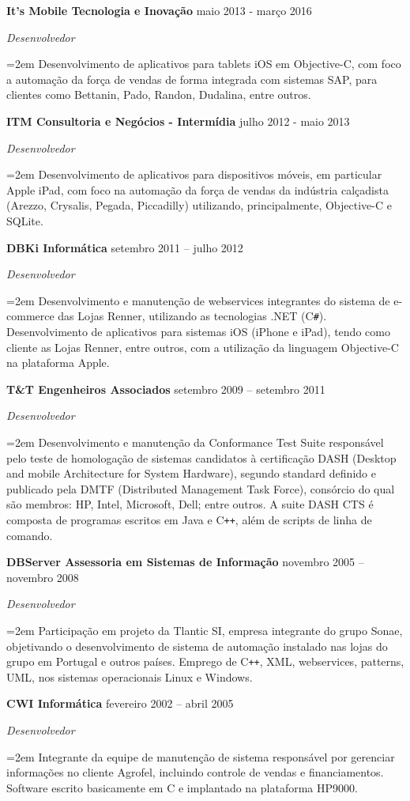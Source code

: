 \documentclass[paper=a4,fontsize=11pt]{scrartcl} %
\newcommand{\sepspace}{\vspace*{1em}}		%
\newcommand{\EducationEntry}[4]{
		\noindent \textbf{#1} \hfill      %
        #2 \par
		\noindent \textit{#3} \par        %
		\noindent\hangindent=2em\hangafter=0 \small #4 %
		\normalsize \par}
\newcommand{\WorkEntry}[4]{				  %
		\noindent \textbf{#1} \hfill      %
        #2 \par
		\noindent \textit{#3} \par        %
		\noindent\hangindent=2em\hangafter=0 \small #4 %
		\normalsize \par}
\begin{document}
\WorkEntry{It’s Mobile Tecnologia e Inovação}{maio 2013 - março 2016}{Desenvolvedor}{Desenvolvimento de aplicativos para tablets iOS em Objective-C, com foco a automação da força de vendas de forma integrada com sistemas SAP, para clientes como Bettanin, Pado, Randon, Dudalina, entre outros.}

\newpage

\WorkEntry{ITM Consultoria e Negócios - Intermídia}{julho 2012 - maio 2013}{Desenvolvedor}{Desenvolvimento de aplicativos para dispositivos móveis, em particular Apple iPad, com foco na automação da força de vendas da indústria calçadista (Arezzo, Crysalis, Pegada, Piccadilly) utilizando, principalmente, Objective-C e SQLite.}
\sepspace
\sepspace

\WorkEntry{DBKi Informática}{setembro 2011 – julho 2012}{Desenvolvedor}{Desenvolvimento e manutenção de webservices integrantes do sistema de e-commerce das Lojas Renner, utilizando as tecnologias .NET (C\texttt{\#}). Desenvolvimento de aplicativos para sistemas iOS (iPhone e iPad), tendo como cliente as Lojas Renner, entre outros, com a utilização da linguagem Objective-C na plataforma Apple.}
\sepspace
\sepspace

\WorkEntry{T\&T Engenheiros Associados}{setembro 2009 – setembro 2011}{Desenvolvedor}{Desenvolvimento e manutenção da Conformance Test Suite responsável pelo teste de homologação de sistemas candidatos à certificação DASH (Desktop and mobile Architecture for System Hardware), segundo standard definido e publicado pela DMTF (Distributed Management Task Force), consórcio do qual são membros: HP, Intel, Microsoft, Dell; entre outros. A suite DASH CTS é composta de programas escritos em Java e C\texttt{++}, além de scripts de linha de comando.}
\sepspace
\sepspace

\WorkEntry{DBServer Assessoria em Sistemas de Informação}{novembro 2005 – novembro 2008}{Desenvolvedor}{Participação em projeto da Tlantic SI, empresa integrante do grupo Sonae, objetivando o desenvolvimento de sistema de automação instalado nas lojas do grupo em Portugal e outros países. Emprego de C\texttt{++}, XML, webservices, patterns, UML, nos sistemas operacionais Linux e Windows.}
\sepspace
\sepspace

\WorkEntry{CWI Informática}{fevereiro 2002 – abril 2005}{Desenvolvedor}{Integrante da equipe de manutenção de sistema responsável por gerenciar informações no cliente Agrofel, incluindo controle de vendas e financiamentos. Software escrito basicamente em C e implantado na plataforma HP9000.}
\sepspace
\sepspace
\end{document}
